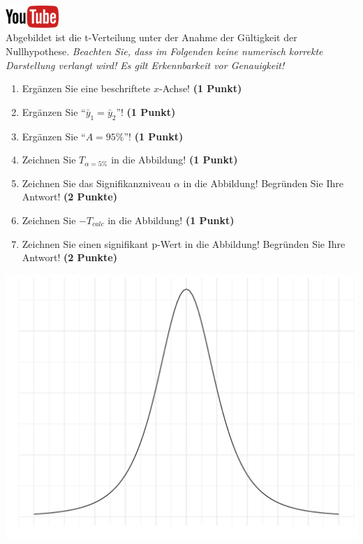 \documentclass[a4paper, 9pt]{scrartcl}\usepackage[]{graphicx}\usepackage[]{xcolor}
\makeatletter
\def\maxwidth{ %
  \ifdim\Gin@nat@width>\linewidth
    \linewidth
  \else
    \Gin@nat@width
  \fi
}
\makeatother
\begin{document}
\hfill\href{https://youtu.be/32JjH1eyuTU}{\includegraphics[width =
  2cm]{img/youtube}}\\[1Ex]



Abgebildet ist die t-Verteilung unter der Anahme der G{\"u}ltigkeit der
Nullhypothese. \textit{Beachten Sie, dass im Folgenden keine
  numerisch korrekte Darstellung verlangt wird! Es gilt Erkennbarkeit vor
  Genauigkeit!}

\begin{enumerate}
\item Erg{\"a}nzen Sie eine beschriftete $x$-Achse! \textbf{(1 Punkt)}
\item Erg{\"a}nzen Sie "`$\bar{y}_1 = \bar{y}_2$"'! \textbf{(1 Punkt)} 
\item Erg{\"a}nzen Sie "`$A = 95\%$"'! \textbf{(1 Punkt)}
\item Zeichnen Sie $T_{\alpha=5\%}$ in die Abbildung! \textbf{(1 Punkt)} 
\item Zeichnen Sie das Signifikanzniveau $\alpha$ in die Abbildung! Begr{\"u}nden
  Sie Ihre Antwort! \textbf{(2 Punkte)} 
\item Zeichnen Sie $-T_{calc}$ in die Abbildung! \textbf{(1
    Punkt)}
\item Zeichnen Sie einen signifikant p-Wert in die Abbildung! Begr{\"u}nden
  Sie Ihre Antwort! \textbf{(2 Punkte)}   
\end{enumerate}



{\centering \includegraphics[width=\maxwidth]{img/statistisches-testen-3-1} 

}
\end{document}
